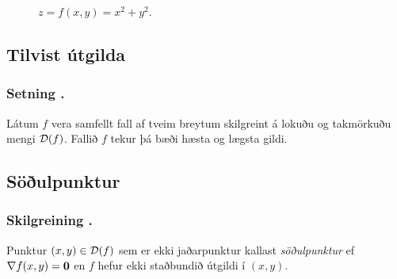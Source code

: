 \begin{figure}[!h]
\begin{minipage}{.5\textwidth}
            \caption*{$z= f(x,y) = x^2+y^2$.}
        \end{minipage}
    \end{figure}





\subsection{Tilvist útgilda} 

\subsubsection{Setning \kaflanr.}
Látum $f$ vera samfellt fall af tveim breytum
skilgreint á lokuðu og takmörkuðu mengi ${\cal D}(f)$.  Fallið $f$
  tekur þá bæði hæsta og lægsta gildi. 






\subsection{Söðulpunktur} 

\subsubsection{Skilgreining \kaflanr.}
 Punktur $(x,y)\in  {\cal D}(f)$ sem er ekki
jaðarpunktur kallast {\em \color{red} söðulpunktur} ef $\nabla f(x,y)=\mbox{${\bf 0}$}$ en $f$
hefur ekki staðbundið útgildi í $(x,y)$.




